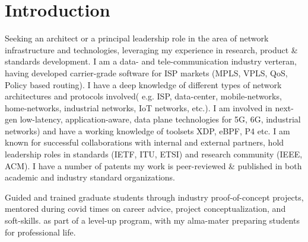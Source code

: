 \documentclass[11pt,a4paper,sans]{moderncv} %
\begin{document}
\makecvtitle %
\vspace{-13mm}
\section{Introduction}
 {Seeking an architect or a principal leadership role in the area of network infrastructure and technologies, leveraging my experience in research, product \& standards development.}
 {I am a data- and tele-communication industry  verteran, having developed carrier-grade software for ISP markets (MPLS, VPLS, QoS, Policy based routing). I have a deep knowledge of different types of network architectures and protocols involved( e.g. ISP, data-center, mobile-networks, home-networks, industrial networks, IoT networks, etc.). I am involved in next-gen low-latency, application-aware, data plane technologies for 5G, 6G, industrial networks) and have a working knowledge of toolsets XDP, eBPF, P4 etc. I am known for successful collaborations with internal and external partners, hold leadership roles in standards (IETF, ITU, ETSI) and research community (IEEE, ACM). \newline I have a number of patents my work is peer-reviewed \& published in both academic and industry standard organizations.}

  { Guided and trained graduate students through industry proof-of-concept projects, mentored during covid times on career advice, project conceptualization, and soft-skills. as part of a level-up program, with my alma-mater preparing students for professional life.}

\end{document}
